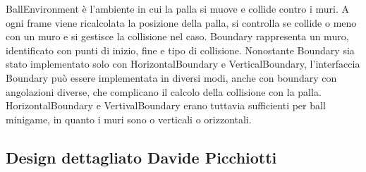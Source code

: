\documentclass[a4paper,12pt]{report}
\begin{document}
    BallEnvironment è l'ambiente in cui la palla si muove e collide contro i muri.
    A ogni frame viene ricalcolata la posizione della palla, si controlla se collide o meno con un muro e si gestisce la collisione nel caso.
    Boundary rappresenta un muro, identificato con punti di inizio, fine e tipo di collisione.
    Nonostante Boundary sia stato implementato solo con HorizontalBoundary e VerticalBoundary, l'interfaccia Boundary può essere implementata in diversi modi, anche con boundary con angolazioni diverse, che complicano il calcolo della collisione con la palla.
    HorizontalBoundary e VertivalBoundary erano tuttavia sufficienti per ball minigame, in quanto i muri sono o verticali o orizzontali.

	\subsection{Design dettagliato Davide Picchiotti}
\end{document}
